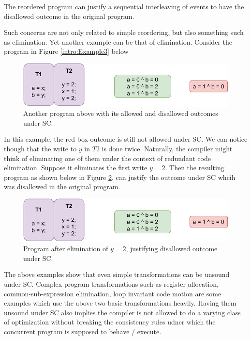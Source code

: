     The reordered program can justify a sequential interleaving of events to have the disallowed outcome in the original program. 

    Such concerns are not only related to simple reordering, but also something such as elimination. 
    Yet another example can be that of elimination. Consider the program in Figure \ref{intro:Example3} below
    \begin{figure}[H]
        \centering
        \includegraphics[scale=0.7]{2.Background/SC_Example2(a).pdf}
        \caption{Another program above with its allowed and disallowed outcomes under SC.}
        \label{intro:Example3(a)}
    \end{figure}

    In this example, the red box outcome is still not allowed under SC. We can notice though that the write to $y$ in $T2$ is done twice. 
    Naturally, the compiler might think of eliminating one of them under the context of redundant code elimination. 
    Suppose it eliminates the first write $y=2$. 
    Then the resulting program as shown below in Figure \ref{intro:Example3(b)}, can justify the outcome under SC whcih was disallowed in the original program.
    \begin{figure}[H]
        \centering
        \includegraphics[scale=0.7]{2.Background/SC_Example2(a).pdf}
        \caption{Program after elimination of $y=2$, justifying disallowed outcome under SC.}
        \label{intro:Example3(b)}
    \end{figure}

    The above examples show that even simple transformations can be unsound under SC. Complex program transformations such as register allocation, common-sub-expression elimination, loop invariant code motion are some examples which use the above two basic transformations heavily. 
    Having them unsound under SC also implies the compiler is not allowed to do a varying class of optimization without breaking the consistency rules udner which the concurrent program is supposed to behave / execute. 

